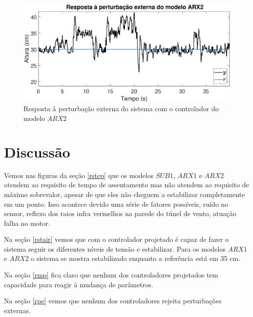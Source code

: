\begin{figure}[H]
	\centering
	\includegraphics[width=1\linewidth]{pextrealarx2}
	\caption[Resposta à perturbação externa do modelo $ARX2$]{Resposta à perturbação externa do sistema com o controlador do modelo $ARX2$}
	\label{fig:pextrealarx2}
\end{figure}



\section{Discussão}

Vemos nas figuras da seção \ref{rstep} que os modelos $SUB1$, $ARX1$ e $ARX2$ atendem ao requisito de tempo de assentamento mas não atendem ao requisito de máximo sobrevalor, apesar de que eles não cheguem a estabilizar completamente em um ponto. Isso acontece devido uma série de fatores possíveis, ruído no sensor, reflexo dos raios infra vermelhos na parede do túnel de vento, atuação falha no motor. 


Na seção \ref{rstair} vemos que com o controlador projetado é capaz de fazer o sistema seguir os diferentes níveis de tensão e estabilizar. Para os modelos $ARX1$ e $ARX2$ o sistema se mostra estabilizado enquanto a referência está em 35 cm.


Na seção \ref{rmp} fica claro que nenhum dos controladores projetados tem capacidade para reagir à mudança de parâmetros. 


Na seção \ref{rpe} vemos que nenhum dos controladores rejeita perturbações externas. 








